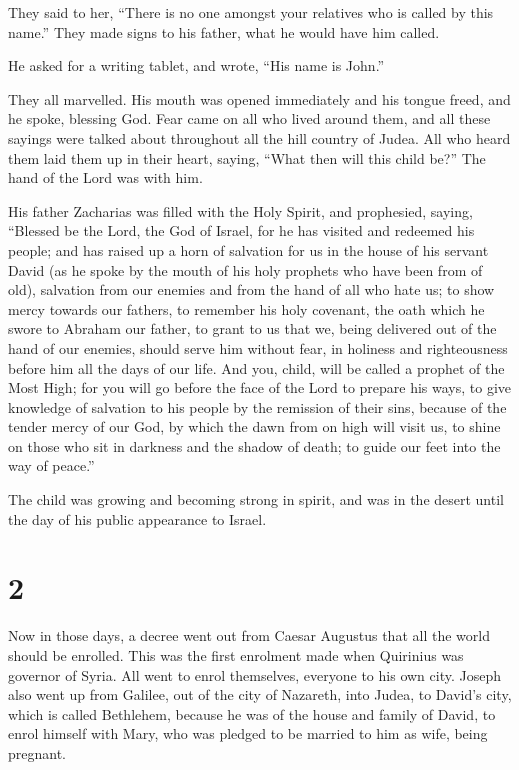  They said to her, ``There is no one amongst your
relatives who is called by this name.''  They made signs
to his father, what he would have him called.

 He asked for a writing tablet, and wrote, ``His name is
John.''

They all marvelled.  His mouth was opened immediately and
his tongue freed, and he spoke, blessing God.  Fear came
on all who lived around them, and all these sayings were talked about
throughout all the hill country of Judea.  All who heard
them laid them up in their heart, saying, ``What then will this child
be?'' The hand of the Lord was with him.

 His father Zacharias was filled with the Holy Spirit,
and prophesied, saying,  ``Blessed be the Lord, the God
of Israel, for he has visited and redeemed his people; 
and has raised up a horn of salvation for us in the house of his servant
David  (as he spoke by the mouth of his holy prophets who
have been from of old),  salvation from our enemies and
from the hand of all who hate us;  to show mercy towards
our fathers, to remember his holy covenant,  the oath
which he swore to Abraham our father,  to grant to us
that we, being delivered out of the hand of our enemies, should serve
him without fear,  in holiness and righteousness before
him all the days of our life.  And you, child, will be
called a prophet of the Most High; for you will go before the face of
the Lord to prepare his ways,  to give knowledge of
salvation to his people by the remission of their sins, 
because of the tender mercy of our God, by which the dawn from on high
will visit us,  to shine on those who sit in darkness and
the shadow of death; to guide our feet into the way of peace.''

 The child was growing and becoming strong in spirit, and
was in the desert until the day of his public appearance to Israel.

\hypertarget{section-1}{%
\section{2}\label{section-1}}

 Now in those days, a decree went out from Caesar Augustus
that all the world should be enrolled.  This was the first
enrolment made when Quirinius was governor of Syria.  All
went to enrol themselves, everyone to his own city. 
Joseph also went up from Galilee, out of the city of Nazareth, into
Judea, to David's city, which is called Bethlehem, because he was of the
house and family of David,  to enrol himself with Mary,
who was pledged to be married to him as wife, being pregnant.

